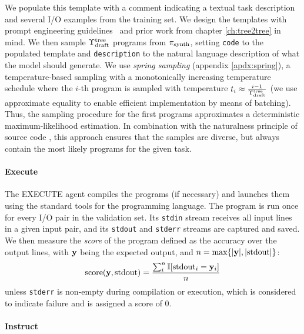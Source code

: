 We populate this template with a comment indicating a textual task description and several I/O examples from the training set.
We design the templates with prompt engineering guidelines~\cite{PromptEngineering} and prior work from chapter \ref{ch:tree2tree} in mind.
We then sample $\Upsilon^\text{tree}_\text{draft}$ programs from $ \pi_\text{synth} $, setting \texttt{code} to the populated template and \texttt{description} to the natural language description of what the model should generate.
We use \emph{spring sampling} (appendix \ref{apdx:spring}), a temperature-based sampling with a monotonically increasing temperature schedule where the $i$-th program is sampled with temperature $t_i \approx \frac{i-1}{\Upsilon^\text{tree}_\text{draft}}$ (we use approximate equality to enable efficient implementation by means of batching).
Thus, the sampling procedure for the first programs approximates a deterministic maximum-likelihood estimation.
In combination with the naturalness principle of source code \cite{allamanis2018:survey,jiang2022:bugs}, this approach ensures that the samples are diverse, but always contain the most likely programs for the given task.

\paragraph{Execute}
\label{sec:seidr-execute}

The EXECUTE agent compiles the programs (if necessary) and launches them using the standard tools for the programming language.
The program is run once for every I/O pair in the validation set. 
Its \texttt{stdin} stream receives all input lines in a given input pair, and its \texttt{stdout} and \texttt{stderr} streams are captured and saved.
We then measure the \emph{score} of the program defined as the accuracy over the output lines, with $\mathbf{y}{}$ being the expected output, and $n=\max\{|\mathbf{y}{}|, |\text{stdout}|\}$:
\[    
\text{score}(\mathbf{y}{}, \text{stdout}) = \frac{\sum^{n}_i{\mathbb{I}[\text{stdout}_i = \mathbf{y}_i]}}{n} 
\]
unless \texttt{stderr} is non-empty during compilation or execution, which is considered to indicate failure and is assigned a score of 0.

\paragraph{Instruct}
\label{sec:seidr-instruct}

